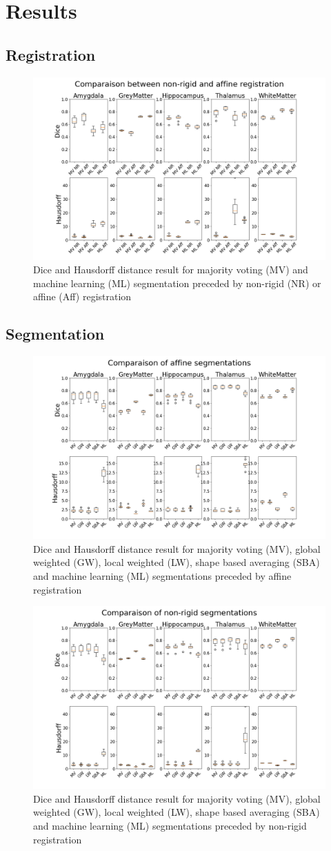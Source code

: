 \section*{Results}
\subsection*{Registration}

\begin{figure}[h!]
	\centering
	\includegraphics[width = .48 \textwidth]{img/boxplotComparisonNRAff}
	\caption{Dice and Hausdorff distance result for majority voting (MV) and machine learning (ML) segmentation preceded by non-rigid (NR) or affine (Aff) registration}
	\label{fig:boxplotReg}
\end{figure}

\subsection*{Segmentation}

\begin{figure}[h!]
	\centering
	\includegraphics[width = .48 \textwidth]{img/boxplot_Affine_all}
	\caption{Dice and Hausdorff distance result for majority voting (MV), global weighted (GW), local weighted (LW), shape based averaging (SBA) and machine learning (ML) segmentations preceded by affine registration}
	\label{fig:boxplotAff}
\end{figure}

\begin{figure}[h!]
	\centering
	\includegraphics[width = .48 \textwidth]{img/boxplot_NR_all}
	\caption{Dice and Hausdorff distance result for majority voting (MV), global weighted (GW), local weighted (LW), shape based averaging (SBA) and machine learning (ML) segmentations preceded by non-rigid registration}
	\label{fig:boxplotNR}
\end{figure}